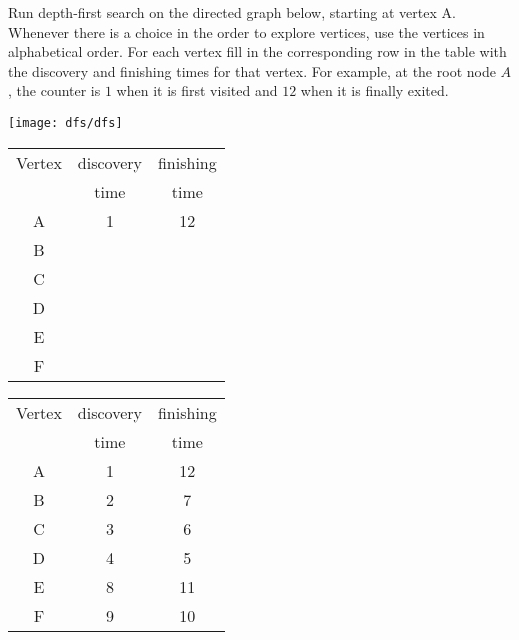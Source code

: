 \begin{problem}
\ask[8]
Run depth-first search on the directed graph below, starting at vertex
A. Whenever there is a choice in the order to explore vertices, use
the vertices in alphabetical order.
For each vertex fill in the corresponding row in the
table with the discovery and finishing
times for that vertex. For example, at the root node $A$, the
counter is $1$ when it is first visited and $12$ when it is finally exited.

\vspace{.1in}
\noindent
\begin{minipage}{.45\textwidth}
\begin{center}
  \texttt{[image: dfs/dfs]}\\[.2in]
\end{center}
\end{minipage}


\begin{minipage}{.45\textwidth}
  \large
  \begin{center}
    \begin{tabular}{c|c|c}
      Vertex & discovery & finishing\\
      & time & time \\
      \hline \hline
      A & 1 & 12 \\
      \hline
      B & & \\
      \hline
      C & & \\
      \hline
      D & & \\
      \hline
      E & & \\
      \hline
      F & & \\
      \hline
    \end{tabular}
  \end{center}
\end{minipage}

\sol
\begin{minipage}{.45\textwidth}
  \begin{center}
    \begin{tabular}{c|c|c}
       Vertex & discovery & finishing\\
      & time & time \\
      \hline \hline
      A & 1 & 12 \\
      \hline
      B & 2 & 7 \\
      \hline
      C & 3 & 6\\
      \hline
      D & 4 & 5\\
      \hline
      E & 8& 11\\
      \hline
      F & 9& 10\\


\end{tabular}
\end{center}
\end{minipage}
\end{problem}
